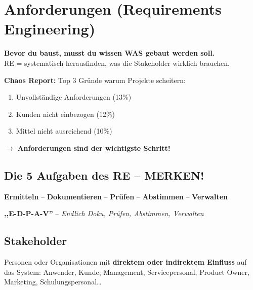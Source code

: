 \documentclass[11pt,a4paper]{article}
\begin{document}
\newpage
\section{Anforderungen (Requirements Engineering)}

\begin{tldr}
\textbf{Bevor du baust, musst du wissen WAS gebaut werden soll.}\\
RE = systematisch herausfinden, was die Stakeholder wirklich brauchen.
\end{tldr}

\begin{story}
\textbf{Chaos Report:} Top 3 Gründe warum Projekte scheitern:
\begin{enumerate}
  \item Unvollständige Anforderungen (13\%)
  \item Kunden nicht einbezogen (12\%)
  \item Mittel nicht ausreichend (10\%)
\end{enumerate}
$\rightarrow$ \textbf{Anforderungen sind der wichtigste Schritt!}
\end{story}

\subsection{Die 5 Aufgaben des RE -- MERKEN!}

\begin{keyfacts}
\textbf{Ermitteln} -- \textbf{Dokumentieren} -- \textbf{Prüfen} -- \textbf{Abstimmen} -- \textbf{Verwalten}
\end{keyfacts}

\begin{merkhilfe}
\textbf{,,E-D-P-A-V''} -- \emph{Endlich Doku, Prüfen, Abstimmen, Verwalten}
\end{merkhilfe}

\subsection{Stakeholder}

\begin{keyfacts}
Personen oder Organisationen mit \textbf{direktem oder indirektem Einfluss} auf das System: Anwender, Kunde, Management, Servicepersonal, Product Owner, Marketing, Schulungspersonal\dots
\end{keyfacts}
\end{document}
